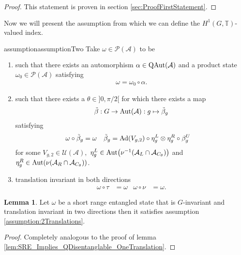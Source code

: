 \documentclass[12pt,a4paper,twoside]{article}
\let\originalleft\left
\let\originalright\right
\renewcommand{\left}{\mathopen{}\mathclose\bgroup\originalleft}
\renewcommand{\right}{\aftergroup\egroup\originalright}
\newcommand{\UU}{\mathcal U}
\newcommand{\PP}{\mathcal P}
\newcommand{\TT}{\mathbb T}
\renewcommand{\AA}{\mathcal A}
\newcommand{\Ad}[1]{\textrm{Ad}\left(#1\right)}
\newcommand{\Aut}[1]{\textrm{Aut}\left(#1\right)}
\newcommand{\QAut}[1]{\textrm{QAut}\left(#1\right)}
\theoremstyle{definition}
\newtheorem{lemma}[theorem]{Lemma}
\numberwithin{equation}{section}
\begin{document}
\begin{proof}
	This statement is proven in section \ref{sec:ProofFirstStatement}.
\end{proof}
Now we will present the assumption from which we can define the $H^1(G,\TT)$-valued index.
\begin{restatable}{assumption}{assumptionTwo}\label{assumption:2Translations}
	Take $\omega\in\PP(\AA)$ to be
	\begin{enumerate}
		\item such that there exists an automorphism $\alpha\in\QAut{\AA}$ and a product state $\omega_0\in\PP(\AA)$ satisfying
		\begin{align}
			\omega=\omega_0\circ\alpha.
		\end{align}
		\item such that there exists a $\theta\in]0,\pi/2[$ for which there exists a map
		\begin{equation}
			\tilde\beta:G\rightarrow\Aut{\AA}:g\mapsto\tilde\beta_g
		\end{equation}
		satisfying
		\begin{align}
			\label{eq:2TranslationsCondition3part1}
			\omega\circ\tilde\beta_g&=\omega&\tilde\beta_g&=\Ad{V_{g,2}}\circ\eta^L_g\otimes\eta^R_g\circ\beta^U_g
		\end{align}
		for some $V_{g,2}\in\UU(\AA),$ $\eta^L_g\in\Aut{\nu^{-1}(\AA_L\cap\AA_{C_\theta})}$ and  $\eta^R_g\in\Aut{\nu(\AA_R\cap\AA_{C_\theta})}$.
		\item translation invariant in both directions
		\begin{align}
			\omega\circ\tau&=\omega&\omega\circ\nu&=\omega.
		\end{align}
	\end{enumerate}
\end{restatable}
\begin{lemma}\label{lem:SRE_Implies_QDisentanglable_TwoTranslations}
	Let $\omega$ be a short range entangled state that is $G$-invariant and translation invariant in two directions then it satisfies assumption \ref{assumption:2Translations}.
\end{lemma}
\begin{proof}
	Completely analogous to the proof of lemma \ref{lem:SRE_Implies_QDisentanglable_OneTranslation}.
\end{proof}
\end{document}
